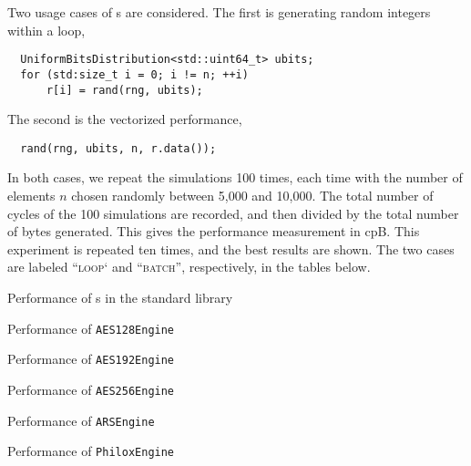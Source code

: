 Two usage cases of \rng{}s are considered. The first is generating random
integers within a loop,
\begin{Verbatim}
  UniformBitsDistribution<std::uint64_t> ubits;
  for (std:size_t i = 0; i != n; ++i)
      r[i] = rand(rng, ubits);
\end{Verbatim}
The second is the vectorized performance,
\begin{Verbatim}
  rand(rng, ubits, n, r.data());
\end{Verbatim}
In both cases, we repeat the simulations 100 times, each time with the number
of elements $n$ chosen randomly between 5,000 and 10,000. The total number of
cycles of the 100 simulations are recorded, and then divided by the total
number of bytes generated. This gives the performance measurement in cpB. This
experiment is repeated ten times, and the best results are shown. The two cases
are labeled ``\textsc{loop}` and ``\textsc{batch}'', respectively, in the
tables below.

\begin{table}
  \caption{Performance of \protect\rng{}s in the standard library}
  \label{tab:Performance of standard library RNG}
\end{table}

\begin{table}
  \caption{Performance of \protect\texttt{AES128Engine}}
  \label{tab:Performance of AES128Engine}
\end{table}

\begin{table}
  \caption{Performance of \protect\texttt{AES192Engine}}
  \label{tab:Performance of AES192Engine}
\end{table}

\begin{table}
  \caption{Performance of \protect\texttt{AES256Engine}}
  \label{tab:Performance of AES256Engine}
\end{table}

\begin{table}
  \caption{Performance of \protect\texttt{ARSEngine}}
  \label{tab:Performance of ARSEngine}
\end{table}

\begin{table}
  \caption{Performance of \protect\texttt{PhiloxEngine}}
  \label{tab:Performance of PhiloxEngine}
\end{table}

